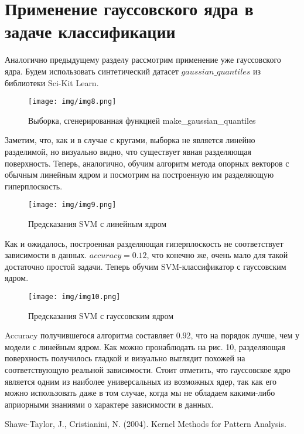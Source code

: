 \documentclass[twoside,twocolumn]{article}
\theoremstyle{plain}
\theoremstyle{definition}
\begin{document}
 \section{Применение гауссовского ядра в задаче классификации}
 Аналогично предыдущему разделу рассмотрим применение уже гауссовского ядра. Будем использовать синтетический датасет $gaussian\_quantiles$
 из библиотеки Sci-Kit Learn.
 \begin{figure}[!h]
  \caption{Выборка, сгенерированная функцией make\_gaussian\_quantiles}
  \centering
  \texttt{[image: img/img8.png]}
  \label{fig:gaus1}
\end{figure}
Заметим, что, как и в случае с кругами, выборка не является линейно разделимой, но визуально видно, что существует явная разделяющая поверхность. 
Теперь, аналогично, обучим алгоритм метода опорных векторов с обычным линейным ядром и посмотрим на построенную им разделяющую гиперплоскость.
\begin{figure}[!h]
  \caption{Предсказания SVM с линейным ядром}
  \centering
  \texttt{[image: img/img9.png]}
  \label{fig:gaus2}
\end{figure}
Как и ожидалось, построенная разделяющая гиперплоскость не соответствует зависимости в данных. $accuracy = 0.12$, что конечно же, очень мало для
такой достаточно простой задачи. Теперь обучим SVM-классификатор с гауссовским ядром.
\begin{figure}[!h]
  \caption{Предсказания SVM с гауссовским ядром}
  \centering
  \texttt{[image: img/img10.png]}
  \label{fig:gaus2}
\end{figure}
Accuracy получившегося алгоритма составляет $0.92$, что на порядок лучше, чем у модели с линейным ядром. Как можно пронаблюдать на рис. 10,
разделяющая поверхность получилось гладкой и визуально выглядит похожей на соответствующую реальной зависимости. Стоит отметить, что гауссовское ядро
является одним из наиболее универсальных из возможных ядер, так как его можно использовать даже в том случае, когда мы не обладаем какими-либо
априорными знаниями о характере зависимости в данных.



\begin{thebibliography}{99} %

Shawe-Taylor, J., Cristianini, N. (2004).
\newblock Kernel Methods for Pattern Analysis.
 
\end{thebibliography}

\end{document}
